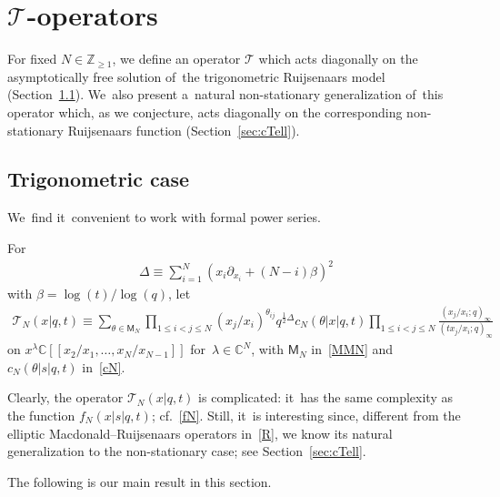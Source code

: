 \documentclass[pdftex]{sigma}%
\numberwithin{equation}{section}
\newcommand{\C}{{\mathbb C}}
\newcommand{\Z}{{\mathbb Z}}
\newcommand{\cT}{{\mathcal T}}
\begin{document}
\section[T-operators]{$\cT$-operators}\label{sec:cT}
For fixed $N\in\Z_{\geq 1}$, we define an operator $\cT$ which acts diagonally on the asymptotically free solution of~the trigonometric Ruijsenaars model (Section~\ref{sec:cTtrig}). We~also present a~natural non-stationary generalization of~this operator which, as we conjecture, acts diagonally on the corresponding non-stationary Ruijsenaars function (Section~\ref{sec:cTell}).

\subsection{Trigonometric case}\label{sec:cTtrig}
We~find it~convenient to work with formal power series.

\begin{Definition} For
\begin{gather}
\label{Delta}
\Delta \equiv \sum_{i=1}^N \left(x_i\partial_{x_i}+(N-i)\beta \right)^2
\end{gather}
with $\beta = \log(t)/\log(q)$, let
\begin{gather}
\label{cTtrig}
\cT_N(x|q,t) \equiv \sum_{\theta\in\mathsf{M}_N} \prod_{1\leq i<j\leq N}(x_j/x_i)^{\theta_{ij}} q^{\frac12\Delta}c_N(\theta|x|q,t)\prod_{1\leq i<j\leq N}\frac{(x_j/x_i;q)_\infty}{(tx_j/x_i;q)_\infty}
\end{gather}
on $x^\lambda \C[[x_2/x_1,\dots,x_N/x_{N-1}]]$ for~$\lambda\in\C^N$, with $\mathsf{M}_N$ in~\eqref{MMN} and $c_N(\theta|s|q,t)$ in~\eqref{cN}.
\end{Definition}

Clearly, the operator $\cT_N(x|q,t)$ is complicated: it~has the same complexity as the function $f_N(x|s|q,t)$; cf.~\eqref{fN}.
Still, it~is interesting since, different from the elliptic Macdonald--Ruijsenaars operators in~\eqref{R}, we know its natural generalization to the non-stationary case; see Section~\ref{sec:cTell}.

The following is our main result in this section.
\end{document}
